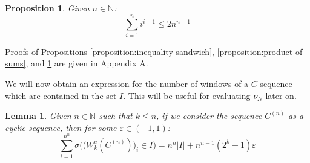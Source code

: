 \documentclass[11pt,a4paper]{tesis}
\theoremstyle{plain}
\newtheorem{lemma}[theorem]{Lemma}
\newtheorem{proposition}[theorem]{Proposition}
\theoremstyle{definition}
\begin{document}
\begin{proposition}\label{proposition:sum-i-to-the-i-m-1}
  Given $n \in \mathbb{N}$:
  \begin{equation*}
    \sum_{i = 1}^{n} i^{i - 1} \le 2 n^{n - 1}
  \end{equation*}
\end{proposition}

Proofs of Propositions \ref{proposition:inequality-sandwich}, \ref{proposition:product-of-sums}, and \ref{proposition:sum-i-to-the-i-m-1} are given in Appendix A.

We will now obtain an expression for the number of windows of a $C$ sequence which are contained in the set $I$. This will be useful for evaluating $\nu_N$ later on.

\begin{lemma}\label{lemma:count-windows-c-sequence-cyclic}
  Given $n \in \mathbb{N}$ such that $k \le n$, if we consider the sequence $C^{(n)}$ as a cyclic sequence, then for some $\varepsilon \in (-1, 1)$:
  \begin{equation*}
    \sum_{i = 1}^{n^n} \sigma\Big( \big( W_k^{c}(C^{(n)}) \big)_i \in I \Big) = n^n |I| + n^{n - 1} (2^k - 1) \varepsilon
  \end{equation*}
\end{lemma}
\end{document}
